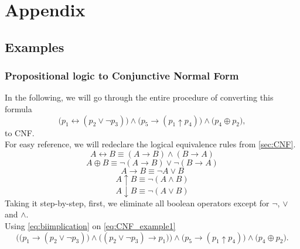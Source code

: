 \section{Appendix}
\subsection{Examples}
\subsubsection{Propositional logic to Conjunctive Normal Form}\label{sec:CNF_conversion_Examp}
In the following, we will go through the entire procedure of converting this formula
\begin{equation}\label{eq:CNF_example1}
    \Big(
        p_1 \leftrightarrow (
            p_2 \vee \neg p_3
        )
    \Big) \wedge \Big(
        p_5 \rightarrow (
            p_1 \uparrow p_4
        )
    \Big) \wedge \Big(
        p_4 \oplus p_2
    \Big),
\end{equation}
 to CNF.
\\
For easy reference, we will redeclare the logical equivalence rules from \autoref{sec:CNF}.
\begin{equation}\label{eq:biimplication}
    A \leftrightarrow B \equiv (A \rightarrow  B) \wedge (B \rightarrow A)
\end{equation}
\begin{equation}\label{eq:XOR}
    A \oplus B \equiv \neg (A \rightarrow B) \vee \neg (B \rightarrow A)
\end{equation}
\begin{equation}\label{eq:implication}
    A \rightarrow B \equiv \neg A \vee B
\end{equation}
\begin{equation}\label{eq:NAND}
    A \uparrow B \equiv \neg (A \wedge B)
\end{equation}
\begin{equation}\label{NOR}
    A \downarrow B \equiv \neg (A \vee B)
\end{equation}
Taking it step-by-step, first, we eliminate all boolean operators except for $\neg$, $\vee$ and $\wedge$.
\\
Using \autoref{eq:biimplication} on \autoref{eq:CNF_example1}
\begin{equation}\label{eq:CNF_example2}
    \bigg(
        \Big(
            p_1 \rightarrow (
                p_2 \vee \neg p_3
            )
        \Big) \wedge \Big(
                (
                    p_2 \vee \neg p_3 
                ) \rightarrow p_1 
            \Big)
    \bigg) \wedge \Big(
        p_5 \rightarrow (
            p_1 \uparrow p_4
        )
    \Big) \wedge \Big(
        p_4 \oplus p_2
    \Big).
\end{equation}
